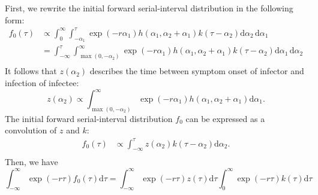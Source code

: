 \documentclass[12pt]{article}
\begin{document}
First, we rewrite the initial forward serial-interval distribution in the following form:
\begin{equation}
\begin{aligned}
f_{0}(\tau) &\propto \int_0^\infty \int_{-\alpha_1}^{\tau} \exp(-r\alpha_1) h(\alpha_1, \alpha_2 + \alpha_1) k(\tau - \alpha_2) \mathrm{d}\alpha_2\,\mathrm{d}\alpha_1\\
&= \int_{-\infty}^{\tau} \int_{\max{(0,-\alpha_2)}}^{\infty} \exp(-r\alpha_1) h(\alpha_1, \alpha_2 + \alpha_1)k(\tau - \alpha_2)\mathrm{d}\alpha_1\, \mathrm{d}\alpha_2\\
\end{aligned}
\end{equation}
It follows that $z(\alpha_2)$ describes the time between symptom onset of infector and infection of infectee:
\begin{equation}
z(\alpha_2) \propto \int_{\max{(0,-\alpha_2)}}^{\infty} \exp(-r\alpha_1) h(\alpha_1, \alpha_2 + \alpha_1) \mathrm{d}\alpha_1.
\end{equation}
The initial forward serial-interval distribution $f_0$ can be expressed as a convolution of $z$ and $k$:
\begin{equation}
\begin{aligned}
f_{0}(\tau) &\propto \int_{-\infty}^{\tau} z(\alpha_2) k(\tau - \alpha_2) \mathrm{d}\alpha_2.\\
\end{aligned}
\end{equation}
Then, we have
\begin{equation}
\int_{-\infty}^\infty \exp(-r\tau) f_{0}(\tau) \mathrm{d} \tau = \int_{-\infty}^\infty \exp(-r\tau) z(\tau) \mathrm{d} \tau \int_{0}^\infty \exp(-r\tau) k(\tau) \mathrm{d} \tau
\end{equation}
\end{document}
